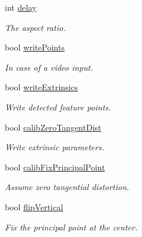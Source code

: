 \begin{DoxyCompactItemize}
int \mbox{\hyperlink{class_settings_a5fe947366441009187d633f9e4663256}{delay}}
\begin{DoxyCompactList}\small\item\em The aspect ratio. \end{DoxyCompactList}\item 
\mbox{\label{class_settings_a53ac449815682c6bfae7e50944ba0565}} 
bool \mbox{\hyperlink{class_settings_a53ac449815682c6bfae7e50944ba0565}{write\+Points}}
\begin{DoxyCompactList}\small\item\em In case of a video input. \end{DoxyCompactList}\item 
\mbox{\label{class_settings_a1cee56847e08f49c90d2f7e2b0511197}} 
bool \mbox{\hyperlink{class_settings_a1cee56847e08f49c90d2f7e2b0511197}{write\+Extrinsics}}
\begin{DoxyCompactList}\small\item\em Write detected feature points. \end{DoxyCompactList}\item 
\mbox{\label{class_settings_a4bc7ff147d74721a3587ce6fcb64ef32}} 
bool \mbox{\hyperlink{class_settings_a4bc7ff147d74721a3587ce6fcb64ef32}{calib\+Zero\+Tangent\+Dist}}
\begin{DoxyCompactList}\small\item\em Write extrinsic parameters. \end{DoxyCompactList}\item 
\mbox{\label{class_settings_a44397eea3f08a0c78808c38bdd716594}} 
bool \mbox{\hyperlink{class_settings_a44397eea3f08a0c78808c38bdd716594}{calib\+Fix\+Principal\+Point}}
\begin{DoxyCompactList}\small\item\em Assume zero tangential distortion. \end{DoxyCompactList}\item 
\mbox{\label{class_settings_ab6304f260b315d2820f755e1c3a052b5}} 
bool \mbox{\hyperlink{class_settings_ab6304f260b315d2820f755e1c3a052b5}{flip\+Vertical}}
\begin{DoxyCompactList}\small\item\em Fix the principal point at the center. \end{DoxyCompactList}\item 

\end{DoxyCompactItemize}
